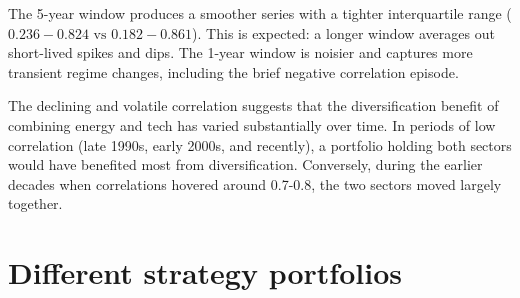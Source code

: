 \documentclass[10pt]{article}
\begin{document}
\begin{enumerate}
    The 5-year window produces a smoother series with a tighter interquartile range ($0.236 - 0.824 \text{ vs } 0.182 - 0.861 $). This is expected: a longer window averages out short-lived spikes and dips. The 1-year window is noisier and captures more transient regime changes, including the brief negative correlation episode. 

    The declining and volatile correlation suggests that the diversification benefit of combining energy and tech has varied substantially over time. In periods of low correlation (late 1990s, early 2000s, and recently), a portfolio holding both sectors would have benefited most from diversification. Conversely, during the earlier decades when correlations hovered around 0.7-0.8, the two sectors moved largely together. 
\end{enumerate}
\newpage 
\section{Different strategy portfolios}
\end{document}
